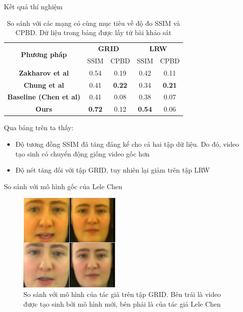 \begin{frame}{Kết quả thí nghiệm}
\begin{table}[h]
    \centering
    \begin{tabular}{c | c | c | c | c}
    \hline 
    \multirow{2}{*}{\textbf{Phương pháp}} & \multicolumn{2}{c|}{\textbf{GRID}} & \multicolumn{2}{c}{\textbf{LRW}}\\
    \cline{2-5}
    & SSIM & CPBD & SSIM & CPBD\\
    \hline
    \textbf{Zakharov et al \cite{zakharov}} & 0.54 & 0.19 & 0.42 & 0.11 \\
    \textbf{Chung et al \cite{chung}} & 0.41 & \textbf{0.22} & 0.34 & \textbf{0.21} \\
    \textbf{Baseline (Chen et al) \cite{chen2019}} & 0.41 & 0.08 & 0.38 & 0.07 \\
    \hline
    \hline
    \textbf{Ours} & \textbf{0.72} & 0.12 & \textbf{0.54} & 0.06 \\
    \hline
    \end{tabular}
    \caption{So sánh với các mạng có cùng mục tiêu về độ đo SSIM và CPBD. Dữ liệu trong bảng được lấy từ bài khảo sát \cite{chen_survey}}
    \label{table:metrics_result}
\end{table}
Qua bảng trên ta thấy:
\begin{itemize}
    \item Độ tương đồng SSIM đã tăng đáng kể cho cả hai tập dữ liệu. Do đó, video tạo sinh có chuyển động giống video gốc hơn
    \item Độ nét tăng đối với tập GRID, tuy nhiên lại giảm trên tập LRW
\end{itemize}
\end{frame}

\begin{frame}{So sánh với mô hình gốc của Lele Chen}
    \begin{figure}[H]
        \centering
        \includegraphics[width=5cm]{images/comparision-grid.png}
        \caption{So sánh với mô hình của tác giả trên tập GRID. Bên trái là video được tạo sinh bởi mô hình mới, bên phải là của tác giả Lele Chen}
    \end{figure}
\end{frame}

